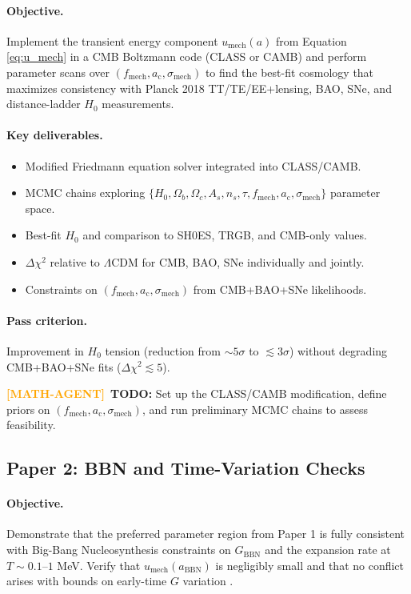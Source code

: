 \documentclass[11pt,a4paper]{article}
\newcommand{\ac}{a_{\mathrm{c}}}
\newcommand{\sigmamech}{\sigma_{\mathrm{mech}}}
\newcommand{\fmech}{f_{\mathrm{mech}}}
\newcommand{\umech}{u_{\mathrm{mech}}}
\theoremstyle{definition}
\newcommand{\MATHAGENT}{\textcolor{orange}{\textbf{[MATH-AGENT]}}}
\begin{document}
\paragraph{Objective.}
Implement the transient energy component $\umech(a)$ from Equation \eqref{eq:u_mech} in a CMB Boltzmann code (CLASS or CAMB) and perform parameter scans over $(\fmech, \ac, \sigmamech)$ to find the best-fit cosmology that maximizes consistency with Planck 2018 TT/TE/EE+lensing, BAO, SNe, and distance-ladder $H_0$ measurements.

\paragraph{Key deliverables.}
\begin{itemize}[leftmargin=1.8em]
  \item Modified Friedmann equation solver integrated into CLASS/CAMB.
  \item MCMC chains exploring $\{H_0, \Omega_b, \Omega_c, A_s, n_s, \tau, \fmech, \ac, \sigmamech\}$ parameter space.
  \item Best-fit $H_0$ and comparison to SH0ES, TRGB, and CMB-only values.
  \item $\Delta\chi^2$ relative to $\Lambda$CDM for CMB, BAO, SNe individually and jointly.
  \item Constraints on $(\fmech, \ac, \sigmamech)$ from CMB+BAO+SNe likelihoods.
\end{itemize}

\paragraph{Pass criterion.}
Improvement in $H_0$ tension (reduction from $\sim 5\sigma$ to $\lesssim 3\sigma$) without degrading CMB+BAO+SNe fits ($\Delta\chi^2 \lesssim 5$).

\MATHAGENT~\textbf{TODO:} Set up the CLASS/CAMB modification, define priors on $(\fmech, \ac, \sigmamech)$, and run preliminary MCMC chains to assess feasibility.

\subsection{Paper 2: BBN and Time-Variation Checks}
\label{sec:paper2}

\paragraph{Objective.}
Demonstrate that the preferred parameter region from Paper 1 is fully consistent with Big-Bang Nucleosynthesis constraints on $G_{\mathrm{BBN}}$ and the expansion rate at $T \sim 0.1$--$1$ MeV. Verify that $\umech(a_{\mathrm{BBN}})$ is negligibly small and that no conflict arises with bounds on early-time $G$ variation \cite{BBN_Gbounds}.
\end{document}
